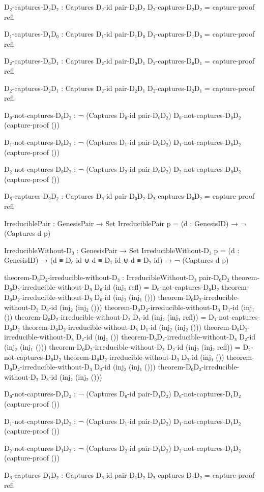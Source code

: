\documentclass[11pt,a4paper]{book}
\begin{document}
\begin{code}
D₂-captures-D₂D₂ : Captures D₂-id pair-D₂D₂
D₂-captures-D₂D₂ = capture-proof refl

D₁-captures-D₁D₀ : Captures D₁-id pair-D₁D₀
D₁-captures-D₁D₀ = capture-proof refl

D₂-captures-D₀D₁ : Captures D₂-id pair-D₀D₁
D₂-captures-D₀D₁ = capture-proof refl

D₂-captures-D₂D₁ : Captures D₂-id pair-D₂D₁
D₂-captures-D₂D₁ = capture-proof refl

D₀-not-captures-D₀D₂ : ¬ (Captures D₀-id pair-D₀D₂)
D₀-not-captures-D₀D₂ (capture-proof ())

D₁-not-captures-D₀D₂ : ¬ (Captures D₁-id pair-D₀D₂)
D₁-not-captures-D₀D₂ (capture-proof ())

D₂-not-captures-D₀D₂ : ¬ (Captures D₂-id pair-D₀D₂)
D₂-not-captures-D₀D₂ (capture-proof ())

D₃-captures-D₀D₂ : Captures D₃-id pair-D₀D₂
D₃-captures-D₀D₂ = capture-proof refl

IrreduciblePair : GenesisPair → Set
IrreduciblePair p = (d : GenesisID) → ¬ (Captures d p)

IrreducibleWithout-D₃ : GenesisPair → Set
IrreducibleWithout-D₃ p = (d : GenesisID) → (d ≡ D₀-id ⊎ d ≡ D₁-id ⊎ d ≡ D₂-id) → ¬ (Captures d p)

theorem-D₀D₂-irreducible-without-D₃ : IrreducibleWithout-D₃ pair-D₀D₂
theorem-D₀D₂-irreducible-without-D₃ D₀-id (inj₁ refl) = D₀-not-captures-D₀D₂
theorem-D₀D₂-irreducible-without-D₃ D₀-id (inj₂ (inj₁ ())) 
theorem-D₀D₂-irreducible-without-D₃ D₀-id (inj₂ (inj₂ ()))
theorem-D₀D₂-irreducible-without-D₃ D₁-id (inj₁ ())
theorem-D₀D₂-irreducible-without-D₃ D₁-id (inj₂ (inj₁ refl)) = D₁-not-captures-D₀D₂
theorem-D₀D₂-irreducible-without-D₃ D₁-id (inj₂ (inj₂ ()))
theorem-D₀D₂-irreducible-without-D₃ D₂-id (inj₁ ())
theorem-D₀D₂-irreducible-without-D₃ D₂-id (inj₂ (inj₁ ()))
theorem-D₀D₂-irreducible-without-D₃ D₂-id (inj₂ (inj₂ refl)) = D₂-not-captures-D₀D₂
theorem-D₀D₂-irreducible-without-D₃ D₃-id (inj₁ ())
theorem-D₀D₂-irreducible-without-D₃ D₃-id (inj₂ (inj₁ ()))
theorem-D₀D₂-irreducible-without-D₃ D₃-id (inj₂ (inj₂ ()))

D₀-not-captures-D₁D₂ : ¬ (Captures D₀-id pair-D₁D₂)
D₀-not-captures-D₁D₂ (capture-proof ())

D₁-not-captures-D₁D₂ : ¬ (Captures D₁-id pair-D₁D₂)
D₁-not-captures-D₁D₂ (capture-proof ())

D₂-not-captures-D₁D₂ : ¬ (Captures D₂-id pair-D₁D₂)
D₂-not-captures-D₁D₂ (capture-proof ())

D₃-captures-D₁D₂ : Captures D₃-id pair-D₁D₂
D₃-captures-D₁D₂ = capture-proof refl


\end{code}
\end{document}
